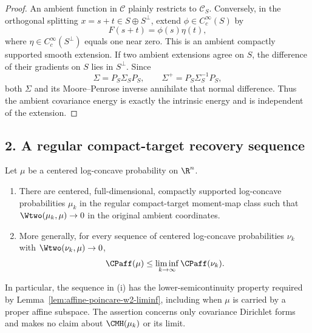 \documentclass[../main.tex]{subfiles}
\begin{document}
\begin{proof}
An ambient function in $\mathscr C$ plainly restricts to $\mathscr C_S$.  Conversely, in the
orthogonal splitting $x=s+t\in S\oplus S^\perp$, extend
$\phi\in C_c^\infty(S)$ by
\[
  F(s+t)=\phi(s)\eta(t),
\]
where $\eta\in C_c^\infty(S^\perp)$ equals one near zero.  This is an ambient compactly
supported smooth extension.  If two ambient extensions agree on $S$, the difference of their
gradients on $S$ lies in $S^\perp$.  Since
\begin{equation}
  \Sigma=P_S\Sigma_SP_S,
  \qquad
  \Sigma^+=P_S\Sigma_S^{-1}P_S,
  \label{eq:sol-cmh-recovery-normal-annihilation}
\end{equation}
both $\Sigma$ and its Moore--Penrose inverse annihilate that normal difference.  Thus the
ambient covariance energy is exactly the intrinsic energy and is independent of the extension.
\end{proof}

\subsection*{2. A regular compact-target recovery sequence}

\begin{theorem}
\label{thm:sol-affine-poincare-w2-liminf}
Let $\mu$ be a centered log-concave probability on $\R^n$.
\begin{enumerate}[label=(\roman*),leftmargin=2.2em]
  \item There are centered, full-dimensional, compactly supported log-concave probabilities
        $\mu_k$ in the regular compact-target moment-map class such that
        $\Wtwo(\mu_k,\mu)\to0$ in the original ambient coordinates.
  \item More generally, for every sequence of centered log-concave probabilities $\nu_k$ with
        $\Wtwo(\nu_k,\mu)\to0$,
        \begin{equation}
          \CPaff(\mu)\le\liminf_{k\to\infty}\CPaff(\nu_k).
          \label{eq:sol-affine-poincare-w2-liminf}
        \end{equation}
\end{enumerate}
In particular, the sequence in (i) has the lower-semicontinuity property required by
Lemma~\ref{lem:affine-poincare-w2-liminf}, including when $\mu$ is carried by a proper affine
subspace.  The assertion concerns only covariance Dirichlet forms and makes no claim about
$\CMH(\mu_k)$ or its limit.
\end{theorem}
\end{document}
